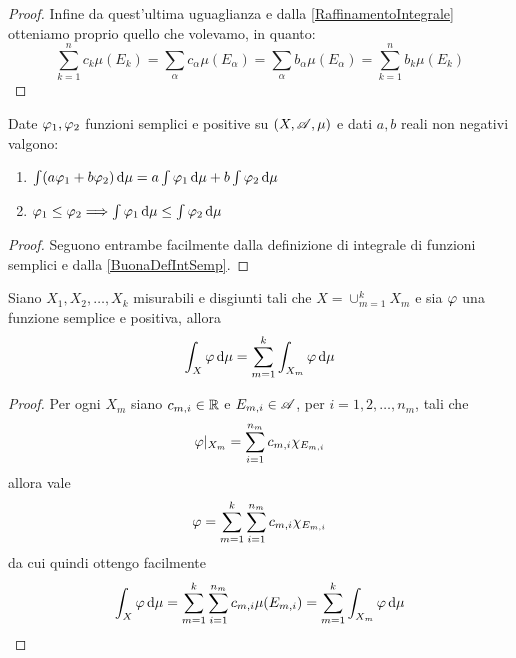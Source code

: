 \begin{proof}
	Infine da quest'ultima uguaglianza e dalla \cref{RaffinamentoIntegrale} otteniamo proprio quello che volevamo, in quanto:
	\begin{equation*}
		\sum_{k=1}^n c_k \mu(E_k)=\sum_\alpha c_\alpha\mu(E_\alpha)=\sum_\alpha b_\alpha\mu(E_\alpha)=\sum_{k=1}^n b_k \mu(E_k)
	\end{equation*}
\end{proof}

\begin{proposition}\label{prop:IntegraleSemplici}
	Date $\varphi_1,\varphi_2$ funzioni semplici e positive su $(X,\mathscr A,\mu)$ e dati $a,b$ reali non negativi valgono:
	\begin{enumerate}
		\item $\int (a\varphi_1+b\varphi_2)\,\mathrm d\mu=a\int \varphi_1\,\mathrm d\mu+b\int \varphi_2\,\mathrm d\mu$ \label{PIS:add}
		\item $\varphi_1\le \varphi_2\Longrightarrow \int \varphi_1\,\mathrm d\mu\le \int \varphi_2\,\mathrm d\mu$ \label{PIS:mono}
	\end{enumerate}
\end{proposition}
\begin{proof}
	Seguono entrambe facilmente dalla definizione di integrale di funzioni semplici e dalla \cref{BuonaDefIntSemp}.
\end{proof}

\begin{proposition}\label{IntegraleSempliciSpezzato}
	Siano $X_1,X_2,\dots,X_k$ misurabili e disgiunti tali che $X=\cup_{m=1}^kX_m$ e sia $\varphi$ una funzione semplice e positiva, allora
	\begin{equation*}
		\int_X \varphi \,\mathrm d \mu=\sum_{m=1}^k \int_{X_m}\varphi\,\mathrm d \mu
	\end{equation*}
\end{proposition}
\begin{proof}
	Per ogni $X_m$ siano $c_{m,i}\in\mathbb R$ e $E_{m,i}\in\mathscr A$, per $i=1,2,\dots,n_m$, tali che 
	\begin{equation*}
		\varphi|_{X_m}=\sum_{i=1}^{n_m}c_{m,i}\chi_{E_{m,i}}
	\end{equation*}
	allora vale
	\begin{equation*}
		\varphi=\sum_{m=1}^k\sum_{i=1}^{n_m}c_{m,i}\chi_{E_{m,i}}
	\end{equation*}
	da cui quindi ottengo facilmente
	\begin{equation*}
		\int_X \varphi \,\mathrm d \mu=\sum_{m=1}^k\sum_{i=1}^{n_m}c_{m,i}\mu(E_{m,i})=\sum_{m=1}^k\int_{X_m}\varphi\,\mathrm d \mu
	\end{equation*}

\end{proof}




